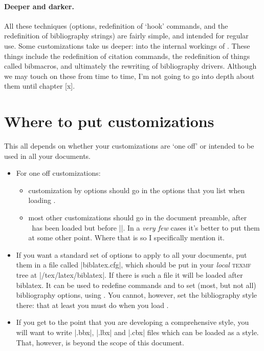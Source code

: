 \paragraph{Deeper and darker.}
All these techniques (options, redefinition of `hook' commands, and
the redefinition of bibliography strings) are fairly simple, and
intended for regular use. Some customizations take us deeper: into the
internal workings of \biblatex. These things include the redefinition
of citation commands, the redefinition of things called bibmacros, and
ultimately the rewriting of bibliography drivers. Although we may
touch on these from time to time, I'm not going to go into depth about
them until chapter [x].

\section{Where to put customizations}

This all depends on whether your customizations are `one off' or
intended to be used in all your documents.
\begin{itemize}
\item For one off customizations:
\begin{itemize}
\item customization by options should go in the options that you list
  when loading \biblatex.
\item most other customizations should go in the document preamble, after
  \biblatex\ has been loaded but before ||. In a \emph{very
  few} cases it's better to put them at some other point. Where that is so
  I specifically mention it.
\end{itemize}
\item If you want a standard set of options to apply to all your
  documents, put them in a file called |biblatex.cfg|, which should be
  put in your \emph{local} \textsc{texmf} tree at
  |/tex/latex/biblatex|. If there is such a file it will be loaded
  after biblatex. It can be used to redefine commands and to set
  (most, but not all) bibliography options, using
  . You
  cannot, however, set the bibliography style there: that at least you
  must do when you load \biblatex.
\item If you get to the point that you
  are developing a comprehensive style, you will want to write |.bbx|,
  |.lbx| and |.cbx| files which can be loaded as a style. That,
  however, is beyond the scope of this document.
\end{itemize}

